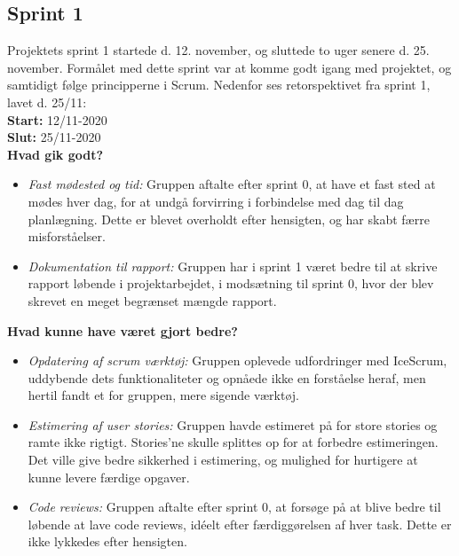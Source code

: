 \subsection{Sprint 1}
Projektets sprint 1 startede d. 12. november, og sluttede to uger senere d. 25. november.
Formålet med dette sprint var at komme godt igang med projektet, og samtidigt følge principperne i Scrum. 
Nedenfor ses retorspektivet fra sprint 1, lavet d. 25/11: \\

\textbf{Start:} 12/11-2020 \\
\textbf{Slut:} 25/11-2020 \\

\textbf{Hvad gik godt?}
\begin{itemize}
    \item \textit{Fast mødested og tid:} Gruppen aftalte efter sprint 0, at have et fast sted at mødes hver dag, for at undgå 
    forvirring i forbindelse med dag til dag planlægning. Dette er blevet overholdt efter hensigten, og har skabt færre misforståelser. 
    \item \textit{Dokumentation til rapport:} Gruppen har i sprint 1 været bedre til at skrive rapport løbende i projektarbejdet, 
    i modsætning til sprint 0, hvor der blev skrevet en meget begrænset mængde rapport. 
\end{itemize}

\textbf{Hvad kunne have været gjort bedre?}
\begin{itemize}
    \item \textit{Opdatering af scrum værktøj:} Gruppen oplevede udfordringer med IceScrum, uddybende dets funktionaliteter 
    og opnåede ikke en forståelse heraf, men hertil fandt et for gruppen, mere sigende værktøj.  
    \item \textit{Estimering af user stories:} Gruppen havde estimeret på for store stories og ramte ikke rigtigt. Stories'ne skulle splittes op 
    for at forbedre estimeringen. Det ville give bedre sikkerhed i estimering, og mulighed for hurtigere at kunne levere færdige opgaver. 
    \item \textit{Code reviews:} Gruppen aftalte efter sprint 0, at forsøge på at blive bedre til løbende at lave code reviews, idéelt efter færdiggørelsen
    af hver task. Dette er ikke lykkedes efter hensigten.
\end{itemize}


